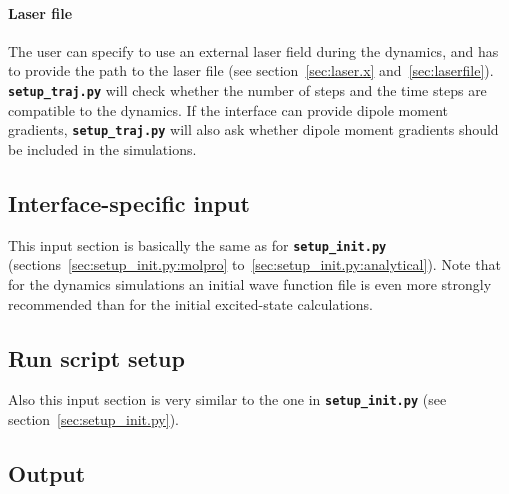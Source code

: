 \documentclass[a4paper,10pt,DIV=15,openany,twoside=false]{scrbook}
\newcommand{\todo}[1]{\textcolor{RL}{#1}}
\newcommand{\ttt}[1]{\textbf{\texttt{#1}}}
\begin{document}
\paragraph{Laser file}

The user can specify to use an external laser field during the dynamics, and has to provide the path to the laser file (see section~\ref{sec:laser.x} and~\ref{sec:laserfile}). \ttt{setup\_traj.py} will check whether the number of steps and the time steps are compatible to the dynamics. If the interface can provide dipole moment gradients, \ttt{setup\_traj.py} will also ask whether dipole moment gradients should be included in the simulations.

\subsection{Interface-specific input}

This input section is basically the same as for \ttt{setup\_init.py} (\todo{sections~\ref{sec:setup_init.py:molpro} to~\ref{sec:setup_init.py:analytical}}). Note that for the dynamics simulations an initial wave function file is even more strongly recommended than for the initial excited-state calculations.

\subsection{Run script setup}

Also this input section is very similar to the one in \ttt{setup\_init.py} (see section~\ref{sec:setup_init.py}).

\subsection{Output}
\end{document}

